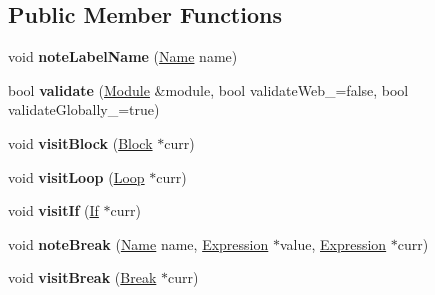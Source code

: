 \subsection*{Public Member Functions}
\begin{DoxyCompactItemize}
\item 
\mbox{\label{structwasm_1_1_wasm_validator_aef5afbff45ff576038d3713fe457d9d2}} 
void {\bfseries note\+Label\+Name} (\mbox{\hyperlink{structwasm_1_1_name}{Name}} name)
\item 
\mbox{\label{structwasm_1_1_wasm_validator_ac92862482b77470cccfb587f190ec425}} 
bool {\bfseries validate} (\mbox{\hyperlink{classwasm_1_1_module}{Module}} \&module, bool validate\+Web\+\_\+=false, bool validate\+Globally\+\_\+=true)
\item 
\mbox{\label{structwasm_1_1_wasm_validator_aa20c801a2ac3f5392e76f73b136356b2}} 
void {\bfseries visit\+Block} (\mbox{\hyperlink{classwasm_1_1_block}{Block}} $\ast$curr)
\item 
\mbox{\label{structwasm_1_1_wasm_validator_afa1b43abd9b777f78b607b0d63455c52}} 
void {\bfseries visit\+Loop} (\mbox{\hyperlink{classwasm_1_1_loop}{Loop}} $\ast$curr)
\item 
\mbox{\label{structwasm_1_1_wasm_validator_a1db3372d8b238e5be400634a85314ed1}} 
void {\bfseries visit\+If} (\mbox{\hyperlink{classwasm_1_1_if}{If}} $\ast$curr)
\item 
\mbox{\label{structwasm_1_1_wasm_validator_aaa3fbc211a03c7a248de1bfdeb303848}} 
void {\bfseries note\+Break} (\mbox{\hyperlink{structwasm_1_1_name}{Name}} name, \mbox{\hyperlink{classwasm_1_1_expression}{Expression}} $\ast$value, \mbox{\hyperlink{classwasm_1_1_expression}{Expression}} $\ast$curr)
\item 
\mbox{\label{structwasm_1_1_wasm_validator_acc99f06d1cfd090512ccf346a378c96c}} 
void {\bfseries visit\+Break} (\mbox{\hyperlink{classwasm_1_1_break}{Break}} $\ast$curr)
\item 
\mbox{\label{structwasm_1_1_wasm_validator_a724647e45425e4f6bf0928c6dcbd8a28}} 

\end{DoxyCompactItemize}
